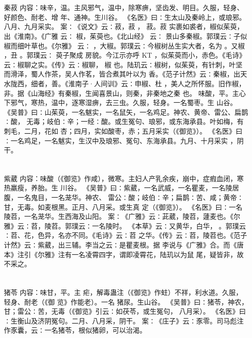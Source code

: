 \documentclass[12pt,UTF8]{ctexbook}
\begin{document}
\section{}秦菽
内容：味辛，温。主风邪气，温中，除寒痹，坚齿发、明目。久服，轻身、好颜色、耐老、增 
年、通神。生川谷。 
《名医》曰∶生太山及秦岭上，或琅邪。八月、九月采实。 
案∶《说文》云∶菽，菽 ， 菽。菽 实裹如裘者，椒似茱萸，出《淮南》。《广雅 
云∶ 椒，茱萸也。《北山经》 
云∶ 
景山多秦椒。郭璞云∶子似椒而细叶草也。《尔雅》 
云∶ ，大椒。郭璞云∶今椒树丛生实大者，名为 。又椒 ，丑 。郭璞云∶ 萸子聚成 
房貌。今江示亦呼 KT ，似茱萸而小，赤色。《毛诗》云∶椒聊之实。《传》云∶椒聊， 
椒 
也。陆玑云∶椒树，似茱萸，有针刺，叶坚而滑泽，蜀人作茶，吴人作茗，皆合煮其叶以为 
香。《范子计然》云∶秦椒，出天水陇西，细者，善。《淮南子·人间训》云∶申椒、杜 
，美人之所怀服。旧作椒，非。据《山海经》有秦椒，生闻喜景山，则秦，非秦地之秦 
也。 
味酸，平。主心下邪气，寒热，温中，逐寒湿痹，去三虫。久服，轻身。一名蜀枣。生 
山谷。 
《吴普》曰∶山茱萸，一名魃实，一名鼠矢，一名鸡足。神农、黄帝、雷公、扁鹊∶酸， 
无毒；岐伯∶辛；一经∶酸。或生冤句、琅邪，或东海承县。叶如梅，有刺毛，二月，花如 
杏；四月，实如酸枣，赤；五月采实（《御览》）。 
《名医》曰∶一名鸡足，一名魃实，生汉中及琅邪、冤句、东海承县。九月、十月采实 
，阴干。 


\section{}紫葳
内容：味酸（《御览》作咸），微寒。主妇人产乳余疾，崩中，症瘕血闭，寒热羸瘦，养胎。生 
川谷。 
《吴普》曰∶紫葳，一名武威，一名瞿麦，一名陵居腹，一名鬼目，一名茏华。神农、 
雷公∶酸；岐伯∶辛；扁鹊∶苦、咸；黄帝∶甘，无毒。如麦根黑。正月、八月采。或生真 
定（《御览》）。 
《名医》曰∶一名陵苕，一名茏华。生西海及山阳。 
案∶《广雅》云∶茈葳，陵苕，蘧麦也。《尔雅》云∶苕，陵苕。郭璞云∶一名陵时。 
《本草》云∶又黄华，白华， 。郭璞云∶苕、花，色异，名亦不同。《毛诗》云∶苕 
之华。《传》云∶苕，陵苕也。《范子计然》云∶紫葳，出三辅。李当之云∶是瞿麦根。据 
李说与《广雅》合。而《唐本》注引《尔雅》注有一名凌霄四字，谓即凌霄花，陆玑以为鼠 
尾，疑皆非，故不采之。 


\section{}猪苓
内容：味甘，平。主 疟，解毒蛊注（《御览》作蛀）不祥，利水道。久服，轻身、耐老（《御 
览》作能老）。一名 猪尿。生山谷。 
《吴普》曰∶猪苓，神农，甘；雷公∶苦，无毒（《御览》引云∶如茯苓，或生冤句， 
八月采）。 
《名医》曰∶生衡山及济阴冤句。二月、八月采，阴干。 
案∶《庄子》云∶豕零。司马彪注作豕囊，云∶一名猪苓，根似猪卵，可以治渴。 
\end{document}
